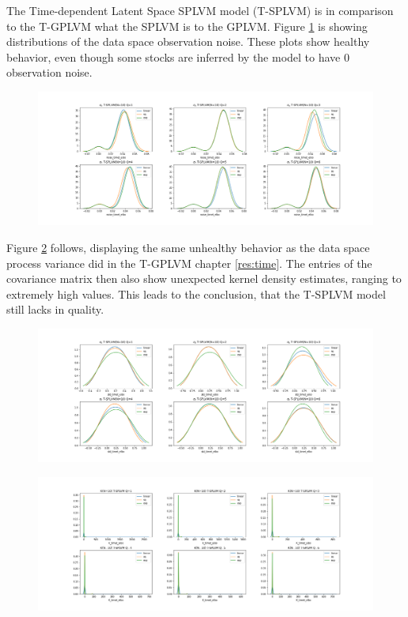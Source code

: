 The Time-dependent Latent Space SPLVM model (T-SPLVM) is in comparison to the T-GPLVM what the SPLVM is to the GPLVM. Figure \ref{fig:tsplvm_noise} is showing distributions of the data space observation noise. These plots show healthy behavior, even though some stocks are inferred by the model to have 0 observation noise. 
\begin{figure}
	\centering
	\includegraphics[width=7in]{img/07_4/noise_timet_elbo.png}
	\caption[]{}
	\label{fig:tsplvm_noise}
\end{figure}
Figure \ref{fig:tsplvm_variance} follows, displaying the same unhealthy behavior as the data space process variance did in the T-GPLVM chapter \ref{res:time}. The entries of the covariance matrix then also show unexpected kernel density estimates, ranging to extremely high values. This leads to the conclusion, that the T-SPLVM model still lacks in quality. 
\begin{figure}
	\centering
	\includegraphics[width=7in]{img/07_4/std_timet_elbo.png}
	\caption[]{}
	\label{fig:tsplvm_variance}
\end{figure}
\begin{figure}
	\centering
	\includegraphics[width=7in]{img/07_4/K_timet_elbo.png}
	\caption[]{}
	\label{}
\end{figure}
